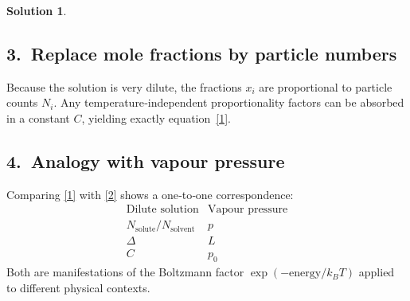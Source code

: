 \documentclass[12pt]{article}
\theoremstyle{definition} %
\newtheorem{solution}{Solution}
\theoremstyle{plain} %
\begin{document}
\begin{solution}
                                \subsection*{3.\  Replace mole fractions by particle numbers}
                                Because the solution is very dilute, the fractions
                                $x_{i}$ are proportional to particle counts $N_{i}$.
                                Any temperature‐independent proportionality factors can be absorbed in
                                a constant $C$, yielding exactly equation~\eqref{1}.
                                
                                \subsection*{4.\  Analogy with vapour pressure}
                                Comparing \eqref{1} with \eqref{2} shows a one‐to‐one correspondence:
                                \[
                                  \begin{array}{c|c}
                                    \text{Dilute solution} & \text{Vapour pressure} \\ \hline
                                    N_{\mathrm{solute}}/N_{\mathrm{solvent}}
                                      & p \\[4pt]
                                    \Delta
                                      & L \\[4pt]
                                    C
                                      & p_{0}
                                  \end{array}
                                \]
                                Both are manifestations of the Boltzmann factor
                                $\exp(-\text{energy}/k_{B}T)$ applied to different physical contexts.
                                \end{solution}
\end{document}
